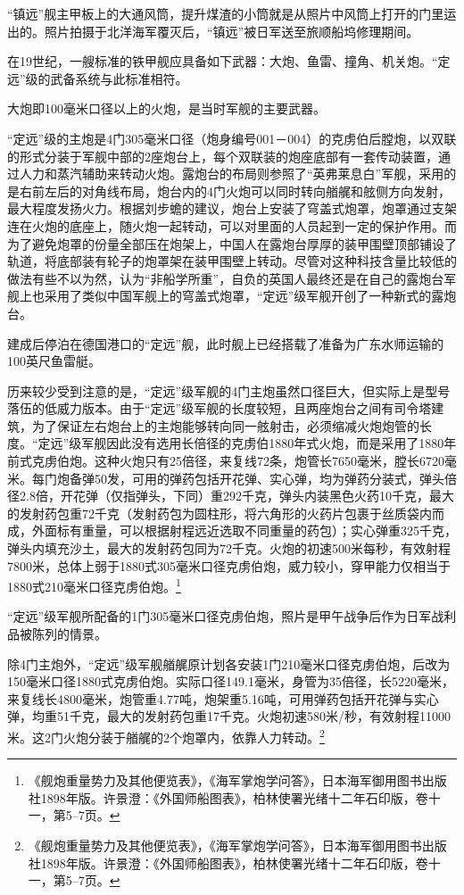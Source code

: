 \documentclass[12pt,UTF8]{ctexbook}
\begin{document}
“镇远”舰主甲板上的大通风筒，提升煤渣的小筒就是从照片中风筒上打开的门里运出的。照片拍摄于北洋海军覆灭后，“镇远”被日军送至旅顺船坞修理期间。

在19世纪，一艘标准的铁甲舰应具备如下武器：大炮、鱼雷、撞角、机关炮。“定远”级的武备系统与此标准相符。

大炮即100毫米口径以上的火炮，是当时军舰的主要武器。

“定远”级的主炮是4门305毫米口径（炮身编号001－004）的克虏伯后膛炮，以双联的形式分装于军舰中部的2座炮台上，每个双联装的炮座底部有一套传动装置，通过人力和蒸汽辅助来转动火炮。露炮台的布局则参照了“英弗莱息白”军舰，采用的是右前左后的对角线布局，炮台内的4门火炮可以同时转向艏艉和舷侧方向发射，最大程度发扬火力。根据刘步蟾的建议，炮台上安装了穹盖式炮罩，炮罩通过支架连在火炮的底座上，随火炮一起转动，可以对里面的人员起到一定的保护作用。而为了避免炮罩的份量全部压在炮架上，中国人在露炮台厚厚的装甲围壁顶部铺设了轨道，将底部装有轮子的炮罩架在装甲围壁上转动。尽管对这种科技含量比较低的做法有些不以为然，认为“非船学所重”，自负的英国人最终还是在自己的露炮台军舰上也采用了类似中国军舰上的穹盖式炮罩，“定远”级军舰开创了一种新式的露炮台。

建成后停泊在德国港口的“定远”舰，此时舰上已经搭载了准备为广东水师运输的100英尺鱼雷艇。

历来较少受到注意的是，“定远”级军舰的4门主炮虽然口径巨大，但实际上是型号落伍的低威力版本。由于“定远”级军舰的长度较短，且两座炮台之间有司令塔建筑，为了保证左右炮台上的主炮能够转向同一舷射击，必须缩减火炮炮管的长度。“定远”级军舰因此没有选用长倍径的克虏伯1880年式火炮，而是采用了1880年前式克虏伯炮。这种火炮只有25倍径，来复线72条，炮管长7650毫米，膛长6720毫米。每门炮备弹50发，可用的弹药包括开花弹、实心弹，均为弹药分装式，弹头倍径2.8倍，开花弹（仅指弹头，下同）重292千克，弹头内装黑色火药10千克，最大的发射药包重72千克（发射药包为圆柱形，将六角形的火药片包裹于丝质袋内而成，外面标有重量，可以根据射程远近选取不同重量的药包）；实心弹重325千克，弹头内填充沙土，最大的发射药包同为72千克。火炮的初速500米每秒，有效射程7800米，总体上弱于1880式305毫米口径克虏伯炮，威力较小，穿甲能力仅相当于1880式210毫米口径克虏伯炮。\footnote{《舰炮重量势力及其他便览表》，《海军掌炮学问答》，日本海军御用图书出版社1898年版。许景澄：《外国师船图表》，柏林使署光绪十二年石印版，卷十一，第5--7页。}

“定远”级军舰所配备的1门305毫米口径克虏伯炮，照片是甲午战争后作为日军战利品被陈列的情景。

除4门主炮外，“定远”级军舰艏艉原计划各安装1门210毫米口径克虏伯炮，后改为150毫米口径1880式克虏伯炮。实际口径149.1毫米，身管为35倍径，长5220毫米，来复线长4800毫米，炮管重4.77吨，炮架重5.16吨，可用弹药包括开花弹与实心弹，均重51千克，最大的发射药包重17千克。火炮初速580米/秒，有效射程11000米。这2门火炮分装于艏艉的2个炮罩内，依靠人力转动。\footnote{《舰炮重量势力及其他便览表》，《海军掌炮学问答》，日本海军御用图书出版社1898年版。许景澄：《外国师船图表》，柏林使署光绪十二年石印版，卷十一，第5--7页。}
\end{document}
